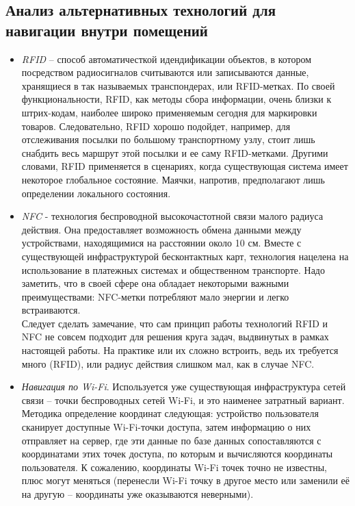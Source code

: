 \subsection{Анализ альтернативных технологий для навигации внутри помещений}

\begin{itemize}
    \item
    \textit{RFID} – способ автоматичесткой идендификации объектов, в котором посредством радиосигналов считываются или записываются данные, хранящиеся в так называемых транспондерах, или RFID-метках. По своей функциональности, RFID, как методы сбора информации, очень близки к штрих-кодам, наиболее широко применяемым сегодня для маркировки товаров. Следовательно, RFID хорошо подойдет, например, для отслеживания посылки по большому транспортному узлу, стоит лишь снабдить весь маршрут этой посылки и ее саму RFID-метками. Другими словами, RFID применяется в сценариях, когда существующая система имеет некоторое глобальное состояние. Маячки, напротив, предполагают лишь определении локального состояния.
    \item
    \textit{NFC} - технология беспроводной высокочастотной связи малого радиуса действия. Она предоставляет возможность обмена данными между устройствами, находящимися на расстоянии около 10 см. Вместе с существующей инфраструктурой бесконтактных карт, технология нацелена на использование в платежных системах и общественном транспорте. Надо заметить, что в своей сфере она обладает некоторыми важными преимуществами: NFC-метки потребляют мало энергии и легко встраиваются. \\ 
    Следует сделать замечание, что сам принцип работы технологий RFID и NFC не совсем подходит для решения круга задач, выдвинутых в рамках настоящей работы. На практике или их сложно встроить, ведь их требуется много (RFID), или радиус действия слишком мал, как в случае NFC.
    \item
    \textit{Навигация по Wi-Fi}. Используется уже существующая инфраструктура сетей связи – точки беспроводных сетей Wi-Fi, и это наименее затратный вариант. Методика определение координат следующая: устройство пользователя сканирует доступные Wi-Fi-точки доступа, затем информацию о них отправляет на сервер, где эти данные по базе данных сопоставляются с координатами этих точек доступа, по которым и вычисляются координаты пользователя. К сожалению, координаты Wi-Fi точек точно не известны, плюс могут меняться (перенесли Wi-Fi точку в другое место или заменили её на другую – координаты уже оказываются неверными). \\

\end{itemize}
